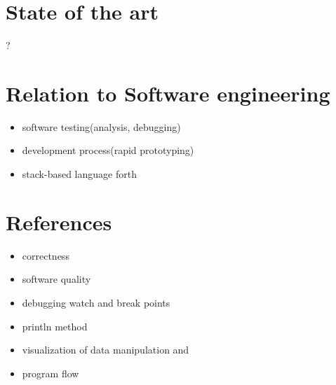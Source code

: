 \section{State of the art}
?

\section{Relation to Software engineering}

\begin{itemize}
	\item software testing(analysis, debugging)
	\item development process(rapid prototyping)
	\item stack-based language forth
\end{itemize}

\section{References}

\begin{itemize}
	\item correctness
	\item software quality
	\item debugging watch and break points
	\item println method
	\item visualization of data manipulation and
	\item program flow
\end{itemize}